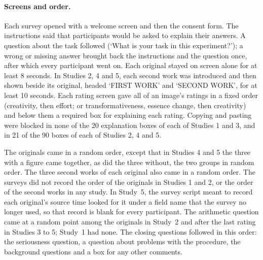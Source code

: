 \paragraph*{Screens and order.}
Each survey opened with a welcome screen and then the consent form. The instructions said that participants would be asked to explain their answers. A question about the task followed (`What is your task in this experiment?'); a wrong or missing answer brought back the instructions and the question once, after which every participant went on. Each original stayed on screen alone for at least 8 seconds. In Studies 2, 4 and 5, each second work was introduced and then shown beside its original, headed `FIRST WORK' and `SECOND WORK', for at least 10 seconds. Each rating screen gave all of an image's ratings in a fixed order (creativity, then effort; or transformativeness, essence change, then creativity) and below them a required box for explaining each rating. Copying and pasting were blocked in none of the 20 explanation boxes of each of Studies 1 and 3, and in 21 of the 90 boxes of each of Studies 2, 4 and 5.

The originals came in a random order, except that in Studies 4 and 5 the three with a figure came together, as did the three without, the two groups in random order. The three second works of each original also came in a random order. The surveys did not record the order of the originals in Studies 1 and 2, or the order of the second works in any study. In Study~5, the survey script meant to record each original's source time looked for it under a field name that the survey no longer used, so that record is blank for every participant. The arithmetic question came at a random point among the originals in Study~2 and after the last rating in Studies 3 to 5; Study~1 had none. The closing questions followed in this order: the seriousness question, a question about problems with the procedure, the background questions and a box for any other comments.


